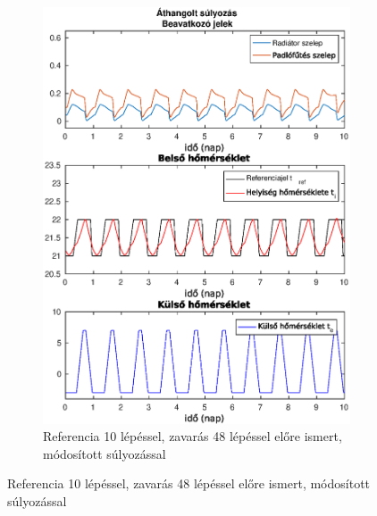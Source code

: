 \documentclass[14pt,handout]{beamer}
\begin{document}
\begin{frame}
\begin{figure}[H]
\begin{subfigure}[t]{0.47\textwidth}
		\includegraphics[trim=0 0 0 0, clip,width=\textwidth]{figures/onlab/compare/A_Cdiff_P10D48}
		\caption{Referencia 10 lépéssel, zavarás 48 lépéssel előre ismert, módosított súlyozással}
		\label{fig:mpc-cdiff-p10d48}
	\end{subfigure}
\end{figure}
\end{frame}
\end{document}
